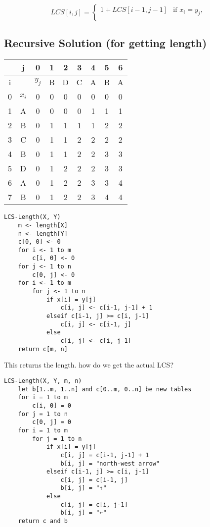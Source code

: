 \documentclass{article}
\begin{document}
\begin{equation*}
    LCS[i, j] = \begin{cases}
        1 + LCS[i - 1, j-1] & \text{if } x_i = y_j, \\
    \end{cases}
\end{equation*}

\subsection*{Recursive Solution (for getting length)}

\begin{tabular}{c|c|ccccccc}
      & j       & 0       & 1 & 2 & 3 & 4 & 5 & 6 \\
    \hline
    i &         & \(y_j\) & B & D & C & A & B & A \\
    0 & \(x_i\) & 0       & 0 & 0 & 0 & 0 & 0 & 0 \\
    1 & A       & 0       & 0 & 0 & 0 & 1 & 1 & 1 \\
    2 & B       & 0       & 1 & 1 & 1 & 1 & 2 & 2 \\
    3 & C       & 0       & 1 & 1 & 2 & 2 & 2 & 2 \\
    4 & B       & 0       & 1 & 1 & 2 & 2 & 3 & 3 \\
    5 & D       & 0       & 1 & 2 & 2 & 2 & 3 & 3 \\
    6 & A       & 0       & 1 & 2 & 2 & 3 & 3 & 4 \\
    7 & B       & 0       & 1 & 2 & 2 & 3 & 4 & 4 \\
\end{tabular}

\begin{verbatim}
LCS-Length(X, Y)
    m <- length[X]
    n <- length[Y]
    c[0, 0] <- 0
    for i <- 1 to m
        c[i, 0] <- 0
    for j <- 1 to n
        c[0, j] <- 0
    for i <- 1 to m
        for j <- 1 to n
            if x[i] = y[j]
                c[i, j] <- c[i-1, j-1] + 1
            elseif c[i-1, j] >= c[i, j-1]
                c[i, j] <- c[i-1, j]
            else
                c[i, j] <- c[i, j-1]
    return c[m, n]
\end{verbatim}

This returns the length. how do we get the actual LCS?
\begin{verbatim}
LCS-Length(X, Y, m, n)
    let b[1..m, 1..n] and c[0..m, 0..n] be new tables
    for i = 1 to m
        c[i, 0] = 0
    for j = 1 to n
        c[0, j] = 0
    for i = 1 to m
        for j = 1 to n
            if x[i] = y[j]
                c[i, j] = c[i-1, j-1] + 1
                b[i, j] = "north-west arrow"
            elseif c[i-1, j] >= c[i, j-1]
                c[i, j] = c[i-1, j]
                b[i, j] = "↑"
            else
                c[i, j] = c[i, j-1]
                b[i, j] = "←"
    return c and b
\end{verbatim}
\end{document}
